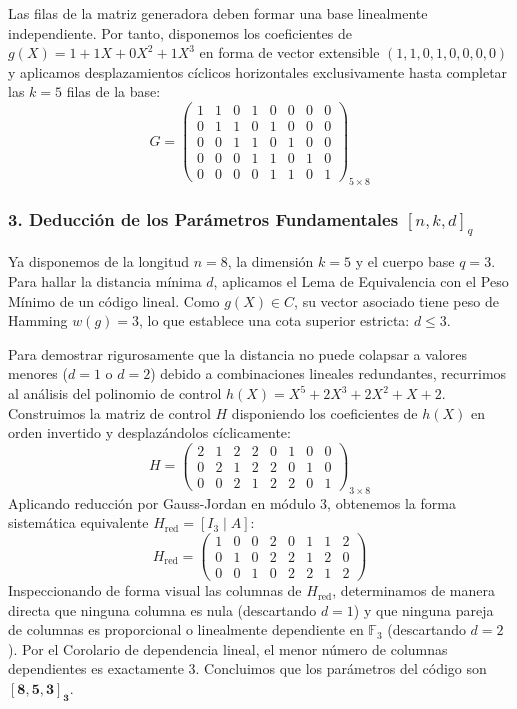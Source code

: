 \documentclass{article}
\begin{document}
Las filas de la matriz generadora deben formar una base linealmente independiente. Por tanto, disponemos los coeficientes de $g(X) = 1 + 1X + 0X^2 + 1X^3$ en forma de vector extensible $(1, 1, 0, 1, 0, 0, 0, 0)$ y aplicamos desplazamientos cíclicos horizontales exclusivamente hasta completar las $k=5$ filas de la base:
\[
G = \begin{pmatrix} 
1 & 1 & 0 & 1 & 0 & 0 & 0 & 0 \\ 
0 & 1 & 1 & 0 & 1 & 0 & 0 & 0 \\ 
0 & 0 & 1 & 1 & 0 & 1 & 0 & 0 \\ 
0 & 0 & 0 & 1 & 1 & 0 & 1 & 0 \\ 
0 & 0 & 0 & 0 & 1 & 1 & 0 & 1 
\end{pmatrix}_{5 \times 8}
\]

\subsubsection{3. Deducción de los Parámetros Fundamentales \texorpdfstring{$[n, k, d]_q$}{[n, k, d]q}}
Ya disponemos de la longitud $n=8$, la dimensión $k=5$ y el cuerpo base $q=3$. Para hallar la distancia mínima $d$, aplicamos el Lema de Equivalencia con el Peso Mínimo de un código lineal. Como $g(X) \in C$, su vector asociado tiene peso de Hamming $w(g) = 3$, lo que establece una cota superior estricta: $d \le 3$.

Para demostrar rigurosamente que la distancia no puede colapsar a valores menores ($d=1$ o $d=2$) debido a combinaciones lineales redundantes, recurrimos al análisis del polinomio de control $h(X) = X^5 + 2X^3 + 2X^2 + X + 2$. Construimos la matriz de control $H$ disponiendo los coeficientes de $h(X)$ en orden invertido y desplazándolos cíclicamente:
\[
H = \begin{pmatrix}
2 & 1 & 2 & 2 & 0 & 1 & 0 & 0 \\
0 & 2 & 1 & 2 & 2 & 0 & 1 & 0 \\
0 & 0 & 2 & 1 & 2 & 2 & 0 & 1
\end{pmatrix}_{3 \times 8}
\]
Aplicando reducción por Gauss-Jordan en módulo 3, obtenemos la forma sistemática equivalente $H_{\text{red}} = [I_3 \mid A]$:
\[
H_{\text{red}} = \begin{pmatrix}
1 & 0 & 0 & 2 & 0 & 1 & 1 & 2 \\
0 & 1 & 0 & 2 & 2 & 1 & 2 & 0 \\
0 & 0 & 1 & 0 & 2 & 2 & 1 & 2
\end{pmatrix}
\]
Inspeccionando de forma visual las columnas de $H_{\text{red}}$, determinamos de manera directa que ninguna columna es nula (descartando $d=1$) y que ninguna pareja de columnas es proporcional o linealmente dependiente en $\mathbb{F}_3$ (descartando $d=2$). Por el Corolario de dependencia lineal, el menor número de columnas dependientes es exactamente 3. Concluimos que los parámetros del código son $\mathbf{[8, 5, 3]_3}$.
\end{document}
